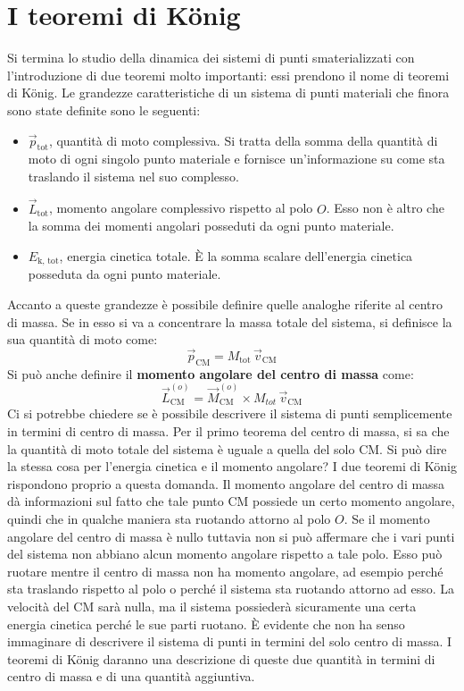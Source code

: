 \documentclass[10pt,a4paper]{book}
\begin{document}
\section{I teoremi di K\"onig}

Si termina lo studio della dinamica dei sistemi di punti smaterializzati con l'introduzione di due teoremi molto importanti: essi prendono il nome di teoremi di K\"onig. Le grandezze caratteristiche di un sistema di punti materiali che finora sono state definite sono le seguenti:
\begin{itemize}
	\item $\vec{p}_\text{tot}$, quantità di moto complessiva. Si tratta della somma della quantità di moto di ogni singolo punto materiale e fornisce un'informazione su come sta traslando il sistema nel suo complesso.
	\item $\vec{L}_\text{tot}$, momento angolare complessivo rispetto al polo $O$. Esso non è altro che la somma dei momenti angolari posseduti da ogni punto materiale.
	\item $E_\text{k, tot}$, energia cinetica totale. È la somma scalare dell'energia cinetica posseduta da ogni punto materiale.
\end{itemize}
Accanto a queste grandezze è possibile definire quelle analoghe riferite al centro di massa. Se in esso si va a concentrare la massa totale del sistema, si definisce la sua quantità di moto come:
\[
	\vec{p}_\text{CM} = M_\text{tot} \, \vec{v}_\text{CM}
\]
Si può anche definire il \textbf{momento angolare del centro di massa} come:
\[
	\boxed{\vec{L}_\text{CM}^{(o)} = \vec{M}_\text{CM}^{(o)} \times M_{tot} \, \vec{v}_\text{CM}}
\]
Ci si potrebbe chiedere se è possibile descrivere il sistema di punti semplicemente in termini di centro di massa. Per il primo teorema del centro di massa, si sa che la quantità di moto totale del sistema è uguale a quella del solo CM. Si può dire la stessa cosa per l'energia cinetica e il momento angolare? I due teoremi di K\"onig rispondono proprio a questa domanda. Il momento angolare del centro di massa dà informazioni sul fatto che tale punto CM possiede un certo momento angolare, quindi che in qualche maniera sta ruotando attorno al polo $O$. Se il momento angolare del centro di massa è nullo tuttavia non si può affermare che i vari punti del sistema non abbiano alcun momento angolare rispetto a tale polo. Esso può ruotare mentre il centro di massa non ha momento angolare, ad esempio perché sta traslando rispetto al polo o perché il sistema sta ruotando attorno ad esso. La velocità del CM sarà nulla, ma il sistema possiederà sicuramente una certa energia cinetica perché le sue parti ruotano. È evidente che non ha senso immaginare di descrivere il sistema di punti in termini del solo centro di massa. I teoremi di K\"onig daranno una descrizione di queste due quantità in termini di centro di massa e di una quantità aggiuntiva.
\end{document}
